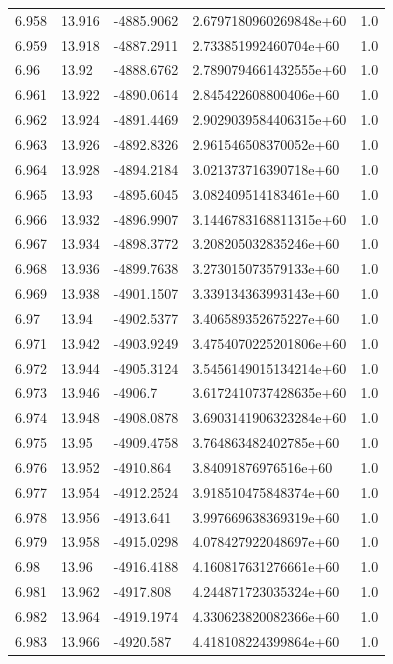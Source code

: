 \begin{tabular}{lllll}
6.958 & 13.916 & -4885.9062 & 2.6797180960269848e+60 & 1.0 \\
6.959 & 13.918 & -4887.2911 & 2.733851992460704e+60 & 1.0 \\
6.96 & 13.92 & -4888.6762 & 2.7890794661432555e+60 & 1.0 \\
6.961 & 13.922 & -4890.0614 & 2.845422608800406e+60 & 1.0 \\
6.962 & 13.924 & -4891.4469 & 2.9029039584406315e+60 & 1.0 \\
6.963 & 13.926 & -4892.8326 & 2.961546508370052e+60 & 1.0 \\
6.964 & 13.928 & -4894.2184 & 3.021373716390718e+60 & 1.0 \\
6.965 & 13.93 & -4895.6045 & 3.082409514183461e+60 & 1.0 \\
6.966 & 13.932 & -4896.9907 & 3.1446783168811315e+60 & 1.0 \\
6.967 & 13.934 & -4898.3772 & 3.208205032835246e+60 & 1.0 \\
6.968 & 13.936 & -4899.7638 & 3.273015073579133e+60 & 1.0 \\
6.969 & 13.938 & -4901.1507 & 3.339134363993143e+60 & 1.0 \\
6.97 & 13.94 & -4902.5377 & 3.406589352675227e+60 & 1.0 \\
6.971 & 13.942 & -4903.9249 & 3.4754070225201806e+60 & 1.0 \\
6.972 & 13.944 & -4905.3124 & 3.5456149015134214e+60 & 1.0 \\
6.973 & 13.946 & -4906.7 & 3.6172410737428635e+60 & 1.0 \\
6.974 & 13.948 & -4908.0878 & 3.6903141906323284e+60 & 1.0 \\
6.975 & 13.95 & -4909.4758 & 3.764863482402785e+60 & 1.0 \\
6.976 & 13.952 & -4910.864 & 3.84091876976516e+60 & 1.0 \\
6.977 & 13.954 & -4912.2524 & 3.918510475848374e+60 & 1.0 \\
6.978 & 13.956 & -4913.641 & 3.997669638369319e+60 & 1.0 \\
6.979 & 13.958 & -4915.0298 & 4.078427922048697e+60 & 1.0 \\
6.98 & 13.96 & -4916.4188 & 4.160817631276661e+60 & 1.0 \\
6.981 & 13.962 & -4917.808 & 4.244871723035324e+60 & 1.0 \\
6.982 & 13.964 & -4919.1974 & 4.330623820082366e+60 & 1.0 \\
6.983 & 13.966 & -4920.587 & 4.418108224399864e+60 & 1.0 \\

\end{tabular}

